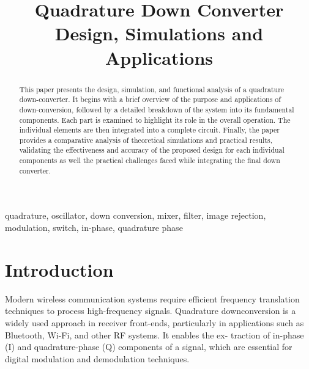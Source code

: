 \documentclass[conference]{IEEEtran}
\begin{document}
\title{Quadrature Down Converter \\ \Large Design, Simulations and Applications}

\author{
}


\maketitle

\begin{abstract}
This paper presents the design, simulation, and functional analysis of a quadrature down-converter. It begins with a brief overview of the purpose and applications of down-conversion, followed by a detailed breakdown of the system into its fundamental components. Each part is examined to highlight its role in the overall operation. The individual elements are then integrated into a complete circuit. Finally, the paper provides a comparative analysis of theoretical simulations and practical results, validating the effectiveness and accuracy of the proposed design for each individual components as well the practical challenges faced while integrating the final down converter.
\end{abstract}

\begin{IEEEkeywords}
quadrature, oscillator, down conversion, mixer,
filter, image rejection, modulation, switch, in-phase, quadrature phase
\end{IEEEkeywords}

\section{Introduction}
Modern wireless communication systems require efficient
frequency translation techniques to process high-frequency
signals. Quadrature downconversion is a widely used approach
in receiver front-ends, particularly in applications such as
Bluetooth, Wi-Fi, and other RF systems. It enables the ex-
traction of in-phase (I) and quadrature-phase (Q) components
of a signal, which are essential for digital modulation and
demodulation techniques.
\end{document}
